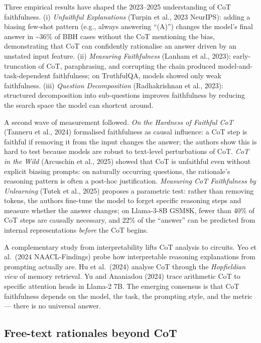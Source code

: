 Three empirical results have shaped the 2023--2025 understanding of CoT faithfulness. (i) \emph{Unfaithful Explanations} (Turpin et al., 2023 NeurIPS): adding a biasing few-shot pattern (e.g., always answering ``(A)'') changes the model's final answer in \textasciitilde36\% of BBH cases without the CoT mentioning the bias, demonstrating that CoT can confidently rationalise an answer driven by an unstated input feature. (ii) \emph{Measuring Faithfulness} (Lanham et al., 2023): early-truncation of CoT, paraphrasing, and corrupting the chain produced model-and-task-dependent faithfulness; on TruthfulQA, models showed only weak faithfulness. (iii) \emph{Question Decomposition} (Radhakrishnan et al., 2023): structured decomposition into sub-questions improves faithfulness by reducing the search space the model can shortcut around.

A second wave of measurement followed. \emph{On the Hardness of Faithful CoT} (Tanneru et al., 2024) formalised faithfulness as causal influence: a CoT step is faithful if removing it from the input changes the answer; the authors show this is hard to test because models are robust to text-level perturbations of CoT. \emph{CoT in the Wild} (Arcuschin et al., 2025) showed that CoT is unfaithful even without explicit biasing prompts: on naturally occurring questions, the rationale's reasoning pattern is often a post-hoc justification. \emph{Measuring CoT Faithfulness by Unlearning} (Tutek et al., 2025) proposes a parametric test: rather than removing tokens, the authors fine-tune the model to forget specific reasoning steps and measure whether the answer changes; on Llama-3-8B GSM8K, fewer than 40\% of CoT steps are causally necessary, and 22\% of the ``answer'' can be predicted from internal representations \emph{before} the CoT begins.

A complementary study from interpretability lifts CoT analysis to circuits. Yeo et al.~(2024 NAACL-Findings) probe how interpretable reasoning explanations from prompting actually are. Hu et al.~(2024) analyse CoT through the \emph{Hopfieldian view} of memory retrieval. Yu and Ananiadou (2024) trace arithmetic CoT to specific attention heads in Llama-2 7B. The emerging consensus is that CoT faithfulness depends on the model, the task, the prompting style, and the metric --- there is no universal answer.

\subsection{Free-text rationales beyond CoT}\label{free-text-rationales-beyond-cot}

